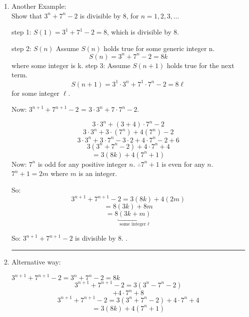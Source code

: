 \documentclass[10pt,letterpaper]{article}
\begin{document}
\newpage{}
\begin{enumerate}
    \item [] Another Example: \\
    \quad Show that $3^{n} + 7^{n} - 2$ is divisible by 8, for $n = 1,2,3, \ldots$
    
    step 1: $S(1) = 3^{1} + 7^{1} - 2 = 8$, which is divisible by $8$.
    
    step 2: $S(n)$ Assume $S(n)$ holds true for some generic integer n.
    $$S(n) = 3^{n} + 7^{n} - 2 = 8k$$ where some integer is k.
    step 3: Assume $S(n+1)$ holds true for the next term.
    $$S(n+1) = 3^{1} \cdot 3^{n} + 7^{1} \cdot 7^{n} - 2 = 8 \ell$$
    for some integer $\ell$.
    
    Now: $3^{n+1} + 7^{n+1} - 2$ = $3\cdot 3^{n} + 7 \cdot 7^{n} - 2$.
    
    $$3 \cdot 3^{n} + (3+4) \cdot 7^{n} - 2$$
    $$3\cdot 3^{n} + 3 \cdot (7^{n}) + 4(7^{n}) - 2$$
    $$3 \cdot 3^{n} + 3 \cdot 7^{n} - 3 \cdot 2 + 4 \cdot 7^{n} - 2 + 6 $$
    $$3 (3^{n} + 7^{n} - 2) + 4 \cdot 7^{n} +  4$$
    $$= 3 (8k) + 4(7^{n} + 1)$$
    Now: $7^{n}$ is odd for any positive integer $n$. $\therefore 7^{n} + 1$ is even for any $n$. 
    $7^{n} + 1 = 2m$ where $m$ is an integer.
    
    So: $$3^{n+1} +7^{n+1} - 2 = 3(8k) + 4(2m)$$
    $$= 8(3k) + 8m$$
    $$=8 \underbracket{(3k+m)}_{\text{some integer } \ell}$$
    
    So: $3^{n+1} + 7^{n+1} - 2$ is divisible by 8. \checkmark.
    
    \vspace{1em}
    \hrule 
    
    \item[] Alternative way:
    
    $3^{n+1} + 7^{n+1} - 2 = \boxed{3^{n} + 7^{n} - 2 = 8k }$
    $$3^{n+1} + 7^{n+1} - 2 = 3(3^{n} - 7^{n} - 2)$$
    $$\boxed{ + 4\cdot 7^{n} + 8}$$
    $$3^{n+1} + 7^{n+1} - 2 = 3 (3^{n} + 7^{n} - 2) + 4 \cdot 7^{n} + 4$$
    $$= 3(8k) + 4(7^{n} + 1)$$
    
    
\end{enumerate}{}
\end{document}
